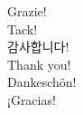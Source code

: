 \documentclass[
  9pt
  , table
  , ignorenonframetext
]{beamer}
\begin{document}
\begin{frame}[plain]
  \begin{center}
    {\LARGE Grazie!}  \\\vspace{6mm}
    {\LARGE Tack!}  \\\vspace{6mm}
    {\LARGE 감사합니다!}\\\vspace{6mm}
    {\LARGE Thank you!}  \\\vspace{6mm}
    {\LARGE Dankesch\"on!} \\\vspace{6mm}
    {\LARGE ¡Gracias!}\\\vspace{6mm}
    {\LARGE \smiley } 
  \end{center}
  
\end{frame}
\end{document}
